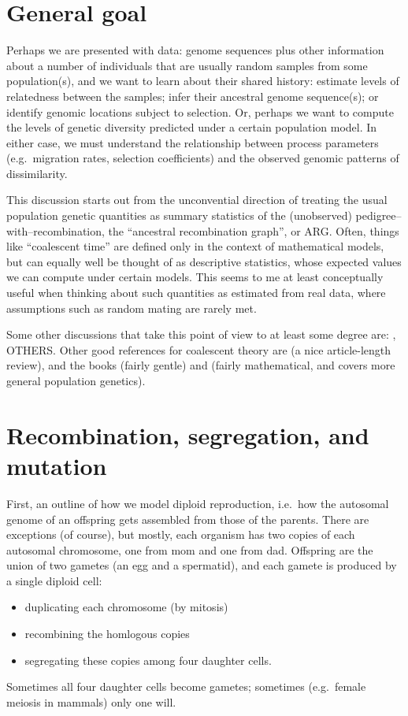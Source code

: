 
\section*{General goal}

Perhaps we are presented with data: genome sequences plus other information
about a number of individuals that are usually random samples from some population(s),
and we want to learn about their shared history: 
estimate levels of relatedness between the samples;
infer their ancestral genome sequence(s);
or identify genomic locations subject to selection.
Or, perhaps we want to compute the levels of genetic diversity 
predicted under a certain population model.
In either case, we must understand the relationship between process parameters
(e.g.\ migration rates, selection coefficients)
and the observed genomic patterns of dissimilarity.

This discussion starts out from the unconvential direction
of treating the usual population genetic quantities as summary statistics
of the (unobserved) pedigree--with--recombination, the ``ancestral recombination graph'', or ARG.
Often, things like ``coalescent time'' are defined only in the context of mathematical models,
but can equally well be thought of as descriptive statistics,
whose expected values we can compute under certain models.
This seems to me at least conceptually useful when thinking about such quantities
as estimated from real data, where assumptions such as random mating are rarely met.

Some other discussions that take this point of view to at least some degree are:
\citet{mcvean2002linkage}, OTHERS.
Other good references for coalescent theory are
\citet{hudson1990gene} (a nice article-length review), 
and the books
\citet{wakeley2005coalescent} (fairly gentle)
and \citet{ewens2004mathematical} (fairly mathematical, and covers more general population genetics).


\section{Recombination, segregation, and mutation}

First, an outline of how we model diploid reproduction, 
i.e.\ how the autosomal genome of an offspring gets assembled from those of the parents.
There are exceptions (of course), but mostly,
each organism has two copies of each autosomal chromosome, 
one from mom and one from dad.
Offspring are the union of two gametes (an egg and a spermatid),
and each gamete is produced by a single diploid cell:
\begin{itemize}
    \item duplicating each chromosome (by mitosis)
    \item recombining the homlogous copies
    \item segregating these copies among four daughter cells.
\end{itemize}
Sometimes all four daughter cells become gametes;
sometimes (e.g.\ female meiosis in mammals) only one will.


